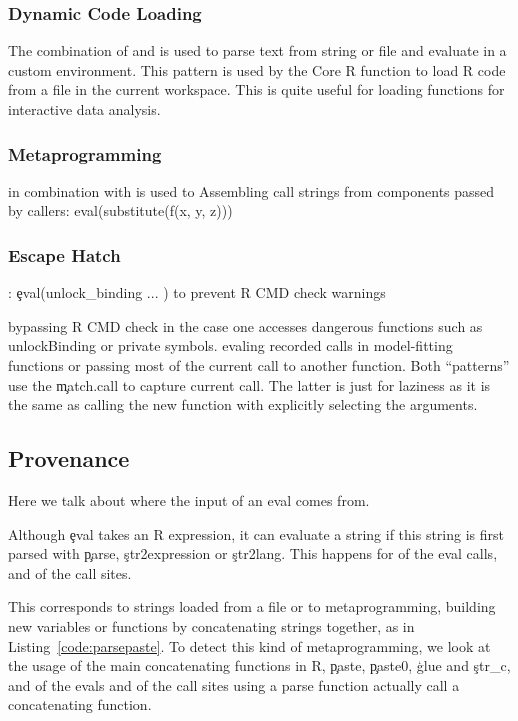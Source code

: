 \documentclass[conference]{IEEEtran}
\begin{document}
  \subsubsection{Dynamic Code Loading} The combination of \parse and \eval is
  used to parse text from string or file and evaluate in a custom environment.
  This pattern is used by the \source Core R function to load R code from a file
  in the current workspace. This is quite useful for loading functions for
  interactive data analysis.

  \subsubsection{Metaprogramming} \eval in combination with \substitute is used
  to
  Assembling call strings from components passed by callers: eval(substitute(f(x, y, z)))

  \subsubsection{Escape Hatch}: \c{eval(unlock_binding ... )} to prevent R CMD check
  warnings

  bypassing R CMD check in the case one accesses dangerous functions such as unlockBinding or private symbols.
 evaling recorded calls in model-fitting functions or passing most of the current call to another function. Both ``patterns'' use the \c{match.call} to capture current call. The latter is just for laziness as it is the same as calling the new function with explicitly selecting the arguments.

\subsection{Provenance}

Here we talk about where the input of an eval comes from.

Although \c{eval} takes an R expression, it can evaluate a string if this string is first parsed with \c{parse}, \c{str2expression} or \c{str2lang}. This happens for \PercentParsedEvals of the eval calls, and \PercentParsedCallSites of the call sites.

This corresponds to strings loaded from a file or to metaprogramming, \ie building new variables or functions by concatenating strings together, as in Listing~\ref{code:parsepaste}. To detect this kind of metaprogramming, we look at the usage of the main concatenating functions in R, \c{paste}, \c{paste0}, \c{glue} and \c{str_c}, and \PasteParsedEvals of the evals and \PasteParsedCallSite of the call sites using a parse function actually call a concatenating function.
\end{document}
